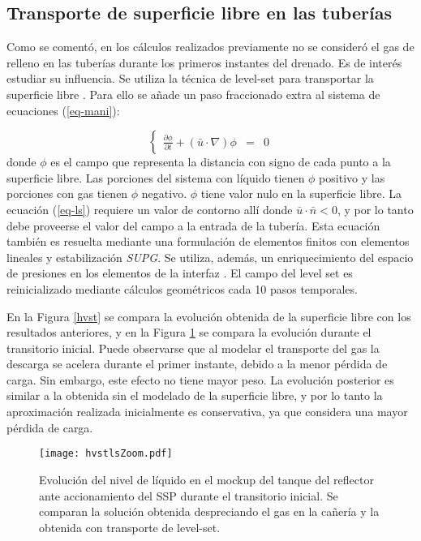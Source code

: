 \subsection*{Transporte de superficie libre en las tuberías}

Como se comentó, en los cálculos realizados previamente no se consideró el gas de relleno en las tuberías durante los primeros instantes del drenado.
Es de interés estudiar su influencia.
Se utiliza la técnica de level-set para transportar la superficie libre \cite{level-set}.
Para ello se añade un paso fraccionado extra al sistema de ecuaciones (\ref{eq-mani}):

\begin{equation}
\left\{ \begin{array}{rcl}
\displaystyle \frac{\partial\phi}{\partial t}+ (\bar{u} \cdot \nabla) \phi &=& 0
\label{eq-ls}
\end{array} \right.
\end{equation}
donde $\phi$ es el campo que representa la distancia con signo de cada punto a la superficie libre.
Las porciones del sistema con líquido tienen $\phi$ positivo y las porciones con gas tienen $\phi$ negativo.
$\phi$ tiene valor nulo en la superficie libre.
La ecuación (\ref{eq-ls}) requiere un valor de contorno allí donde $\bar{u} \cdot \bar{n} < 0$,
y por lo tanto debe proveerse el valor del campo a la entrada de la tubería.
Esta ecuación también es resuelta mediante una formulación de elementos finitos con elementos lineales y estabilización \textit{SUPG}.
Se utiliza, además, un enriquecimiento del espacio de presiones en los elementos de la interfaz \cite{enriq}.
El campo del level set es reinicializado mediante cálculos geométricos cada 10 pasos temporales.

En la Figura \ref{hvst} se compara la evolución obtenida de la superficie libre con los resultados anteriores,
y en la Figura \ref{hvstls} se compara la evolución durante el transitorio inicial.
Puede observarse que al modelar el transporte del gas la descarga se acelera durante el primer instante, debido a la menor pérdida de carga.
Sin embargo, este efecto no tiene mayor peso.
La evolución posterior es similar a la obtenida sin el modelado de la superficie libre,
y por lo tanto la aproximación realizada inicialmente es conservativa, ya que considera una mayor pérdida de carga.

\begin{figure}['ht]
\centering
\texttt{[image: hvstlsZoom.pdf]}
\caption{Evolución del nivel de líquido en el mockup del tanque del reflector ante accionamiento del SSP durante el transitorio inicial.
  Se comparan la solución obtenida despreciando el gas en la cañería y la obtenida con transporte de level-set.}  
	\label{hvstls}
\end{figure}

